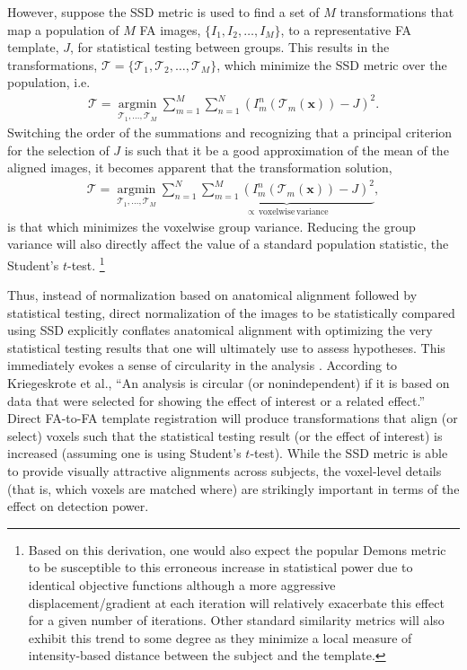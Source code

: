 \documentclass[final,5p,times,twocolumn]{elsarticle}
\begin{document}
However, suppose the SSD metric is used to find a set of $M$ transformations that map a population of $M$ FA images, $\{I_1, I_2, \ldots, I_M\}$, to a representative FA template, $J$, for statistical testing between groups. This results in the transformations,
$\boldsymbol{\mathcal{T}} = \{\mathcal{T}_1, \mathcal{T}_2,\ldots,\mathcal{T}_M \}$, which minimize the SSD metric over the population, i.e.
\begin{align}
  \boldsymbol{\mathcal{T}} = \underset{\mathcal{T}_1, \ldots, \mathcal{T}_M}{\operatorname{argmin}}
    \sum_{m=1}^M\sum_{n=1}^N \left( I^n_m( \mathcal{T}_m(\mathbf{x}) ) - J \right)^2.
\end{align}
Switching the order of the summations and recognizing that a principal criterion for the selection of $J$ is such that it be a good approximation of the mean of the aligned images, it becomes apparent that the transformation solution,
\begin{align}\label{eq:variance}
  \boldsymbol{\mathcal{T}} = \underset{\mathcal{T}_1, \ldots, \mathcal{T}_M}{\operatorname{argmin}}
    \sum_{n=1}^N \underbrace{\sum_{m=1}^M \left( I^n_m( \mathcal{T}_m(\mathbf{x}) ) - J \right)^2}_{
    \propto\mathrm{\,voxelwise\,variance}},
\end{align}
is that which minimizes the voxelwise group variance.  Reducing the group variance will also directly affect the value of a standard population statistic, the Student's $t$-test.%
\footnote{
Based on this derivation, one would also expect the popular Demons metric to be susceptible to this erroneous increase in statistical power due to identical objective functions although a more aggressive displacement/gradient at each iteration will relatively exacerbate this effect for a given number of iterations.  
Other standard similarity metrics will also exhibit this
trend to some degree as they minimize a local measure of intensity-based distance between the subject and the template.
}  

Thus, instead of normalization based on anatomical alignment followed by
statistical testing, direct normalization of the images to be statistically compared using SSD
explicitly conflates
anatomical alignment with optimizing the very statistical testing
results that one will ultimately use to assess hypotheses.  This immediately evokes a sense of circularity in the analysis \citep{Kriegeskorte2010}.
According to Kriegeskrote et al., ``An analysis is circular (or nonindependent) if it is based on data that were selected for showing the effect of interest or a related effect.''  Direct FA-to-FA template registration will produce transformations that align (or select) voxels such that the statistical testing result (or the effect of interest) is increased (assuming one is using Student's 
$t$-test).  While the SSD metric is able to provide visually attractive alignments across subjects, the voxel-level details (that is, which voxels are matched where) are strikingly important in terms of the effect on detection power.  
\end{document}
